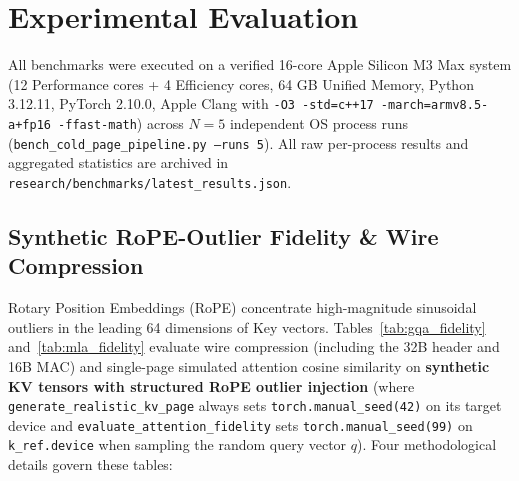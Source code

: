 \documentclass[10pt,twocolumn]{article}
\begin{document}
\section{Experimental Evaluation}

All benchmarks were executed on a verified 16-core Apple Silicon M3 Max system (12 Performance cores + 4 Efficiency cores, 64 GB Unified Memory, Python 3.12.11, PyTorch 2.10.0, Apple Clang with \texttt{-O3 -std=c++17 -march=armv8.5-a+fp16 -ffast-math}) across $N=5$ independent OS process runs (\texttt{bench\_cold\_page\_pipeline.py --runs 5}). All raw per-process results and aggregated statistics are archived in \texttt{research/benchmarks/latest\_results.json}.

\subsection{Synthetic RoPE-Outlier Fidelity \& Wire Compression}
Rotary Position Embeddings (RoPE) concentrate high-magnitude sinusoidal outliers in the leading 64 dimensions of Key vectors. Tables~\ref{tab:gqa_fidelity} and~\ref{tab:mla_fidelity} evaluate wire compression (including the 32B header and 16B MAC) and single-page simulated attention cosine similarity on \textbf{synthetic KV tensors with structured RoPE outlier injection} (where \texttt{generate\_realistic\_kv\_page} always sets \texttt{torch.manual\_seed(42)} on its target device and \texttt{evaluate\_attention\_fidelity} sets \texttt{torch.manual\_seed(99)} on \texttt{k\_ref.device} when sampling the random query vector $q$). Four methodological details govern these tables:
\end{document}
